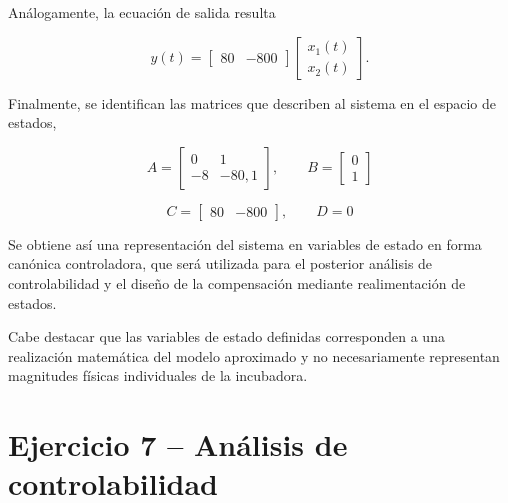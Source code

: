 \documentclass[10pt]{article}
\begin{document}
Análogamente, la ecuación de salida resulta

\begin{equation}
    y(t)=
    \begin{bmatrix}
        80 & -800
    \end{bmatrix}
    \begin{bmatrix}
        x_1(t)\\
        x_2(t)
    \end{bmatrix}.
\end{equation}

Finalmente, se identifican las matrices que describen
al sistema en el espacio de estados,

\begin{equation}
    \boxed{
        A=
        \begin{bmatrix}
            0 & 1\\
            -8 & -80{,}1
        \end{bmatrix},
        \qquad
        B=
        \begin{bmatrix}
            0\\
            1
        \end{bmatrix}
    }
    \label{eq:ej6_matrices_ab}
\end{equation}

\begin{equation}
    \boxed{
        C=
        \begin{bmatrix}
            80 & -800
        \end{bmatrix},
        \qquad D=0
    }
    \label{eq:ej6_matrices_cd}
\end{equation}

Se obtiene así una representación del sistema en variables
de estado en forma canónica controladora, que será utilizada
para el posterior análisis de controlabilidad y el diseño
de la compensación mediante realimentación de estados.

Cabe destacar que las variables de estado definidas
corresponden a una realización matemática del modelo
aproximado y no necesariamente representan magnitudes
físicas individuales de la incubadora.




\clearpage
\setcounter{section}{7}
\setcounter{subsection}{0}
\section*{Ejercicio 7 -- Análisis de controlabilidad}
\end{document}
